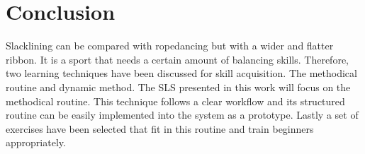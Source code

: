 \section{Conclusion}
Slacklining can be compared with ropedancing but with a wider and flatter ribbon.
It is a sport that needs a certain amount of balancing skills.
Therefore, two learning techniques have been discussed for skill acquisition. 
The methodical routine and dynamic method.
The SLS presented in this work will focus on the methodical routine.
This technique follows a clear workflow and its structured routine can be easily implemented into the system as a prototype.
Lastly a set of exercises have been selected that fit in this routine and train beginners appropriately.
